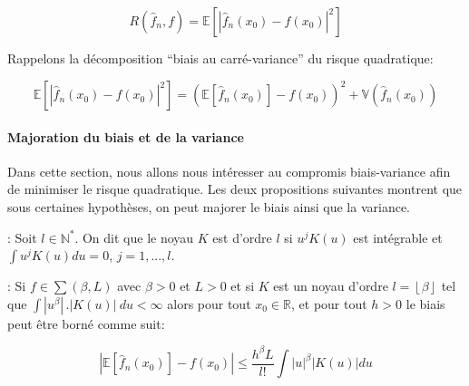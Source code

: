 \documentclass[
]{article}
\begin{document}
\[
R(\hat {f}_n, f) = \mathbb{E}[|\hat {f}_n(x_0) - f(x_0)|^2]
\]

Rappelons la décomposition ``biais au carré-variance'' du risque
quadratique:

\[
  \mathbb{E}[|\hat {f}_n(x_0) - f(x_0)|^2] = (\mathbb{E}[\hat {f}_n(x_0)] - f(x_0))^2 + \mathbb{V}(\hat {f}_n(x_0))
\]

\paragraph{Majoration du biais et de la variance}

Dans cette section, nous allons nous intéresser au compromis
biais-variance afin de minimiser le risque quadratique. Les deux
propositions suivantes montrent que sous certaines hypothèses, on peut
majorer le biais ainsi que la variance.\newline

\begin{definition} : Soit $l \in \mathbb{N^*}$. On dit que le noyau $K$ est d'ordre $l$ si $u^jK(u)$ est intégrable et $\int u^jK(u)du = 0$, $j = {1,...,l}$.\newline
\end{definition}

\begin{proposition}: Si $f \in \sum(\beta,L)$ avec $\beta > 0$ et $L > 0$ et si $K$ est un noyau d'ordre $l = \left\lfloor{\beta}\right\rfloor$ tel que $\int |{u}^{\beta}|\,.|{K(u)}|~du < \infty$ alors pour tout $x_0 \in \mathbb{R}$, et pour tout $h>0$ le biais peut être borné comme suit:

$$
|\mathbb{E}[\hat{f}_n(x_0)] - f(x_0)|\leqslant \frac{h^{\beta}L}{l!}\int|u|^{\beta}|K(u)|du
$$
\end{proposition}
\end{document}
